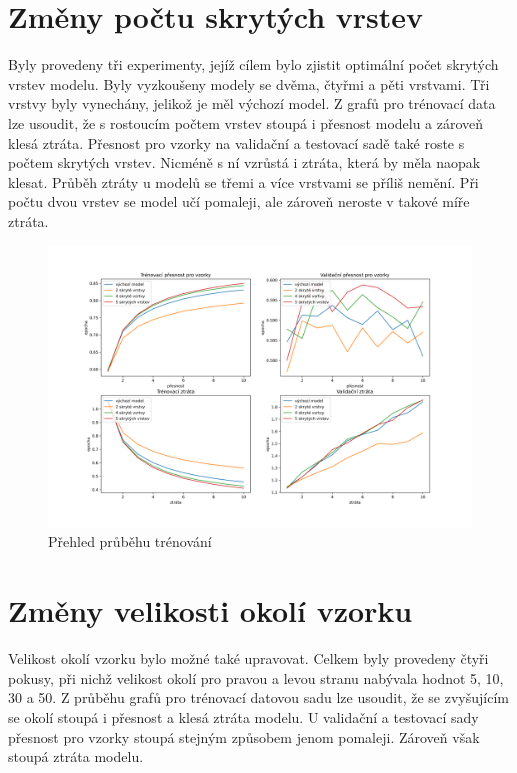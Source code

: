 \documentclass[FM,BP]{tulthesis}
\begin{document}
\section{Změny počtu skrytých vrstev} %
Byly provedeny tři experimenty, jejíž cílem bylo zjistit optimální počet skrytých vrstev modelu. Byly vyzkoušeny modely se dvěma, čtyřmi a pěti vrstvami. Tři vrstvy byly vynechány, jelikož je měl výchozí model. Z grafů pro trénovací data lze usoudit, že s rostoucím počtem vrstev stoupá i přesnost modelu a zároveň klesá ztráta. Přesnost pro vzorky na validační a testovací sadě také roste s počtem skrytých vrstev. Nicméně s ní vzrůstá i ztráta, která by měla naopak klesat. Průběh ztráty u modelů se třemi a více vrstvami se příliš nemění. Při počtu dvou vrstev se model učí pomaleji, ale zároveň neroste v takové míře ztráta.

\begin{figure}[!htbp]
\centerline{\includegraphics[scale=.5]{training_course-layers.png}}
\caption{Přehled průběhu trénování}
\label{fig}
\end{figure}
\FloatBarrier

\section{Změny velikosti okolí vzorku} %
Velikost okolí vzorku bylo možné také upravovat. Celkem byly provedeny čtyři pokusy, při nichž velikost okolí pro pravou a levou stranu nabývala hodnot 5, 10, 30 a 50. Z průběhu grafů pro trénovací datovou sadu lze usoudit, že se zvyšujícím se okolí stoupá i přesnost a klesá ztráta modelu. U validační a testovací sady přesnost pro vzorky stoupá stejným způsobem jenom pomaleji. Zároveň však stoupá ztráta modelu.
\end{document}
